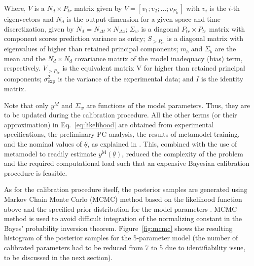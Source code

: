 \documentclass[11pt,titlepage]{article}
\begin{document}
Where, $V$ is a $N_{d} \times P_{tr}$ matrix given 
by $V=[v_1;v_2;\dots;v_{P_{tr}}]$ with $v_i$ is 
the $i$-th eigenvectors and  $N_d$ is the output dimension for a given 
space and time discretization, given by 
$N_d = N_{\Delta t} \times N_{\Delta z} $; 
$\Sigma_w$ is a diagonal $P_{tr} \times P_{tr}$ 
matrix with component scores prediction variance as entry;  
$S_{>P_{tr}}$ is a diagonal matrix 
with eigenvalues of higher than retained principal components;
$m_b$ and $\Sigma_b$ are the mean and the $N_d \times N_d$ covariance 
matrix of the model inadequacy (bias) term, respectively.  
$V_{>P_{tr}}$ is the equivalent matrix V for higher than retained 
principal components; 
$\sigma_\text{exp}^2$ is the variance of the experimental data; 
and $I$ is the identity matrix. 

Note that only $y^M$ and $\Sigma_w$ are functions of the model parameters.
Thus, they are to be updated during the calibration procedure. 
All the other terms (or their approximation) in Eq.~\ref{eq:likelihood} are 
obtained from experimental specifications, the preliminary PC analysis, 
the results of metamodel training, and 
the nominal values of $\underline{\theta}$, as explained in \cite{Wicaksono2016}.
This, combined with the use of metamodel to readily estimate $y^{\text{M}}(\underline{\theta})$, reduced the complexity of the problem and the 
required computational load such that an expensive Bayesian 
calibration procedure is feasible.

As for the calibration procedure itself, the posterior samples are 
generated using Markov Chain Monte Carlo 
(MCMC) method based on the likelihood function 
above and the specified prior distribution for the model parameters 
\cite{Wicaksono2016}. 
MCMC method is used to avoid difficult integration of the normalizing 
constant in the Bayes’ probability inversion theorem. 
Figure~\ref{fig:mcmc} shows the resulting histogram of the posterior samples for 
the 5-parameter model 
(the number of calibrated parameters had to be reduced from 7 to 5 due to 
identifiability issue, to be discussed in the next section).
\end{document}
